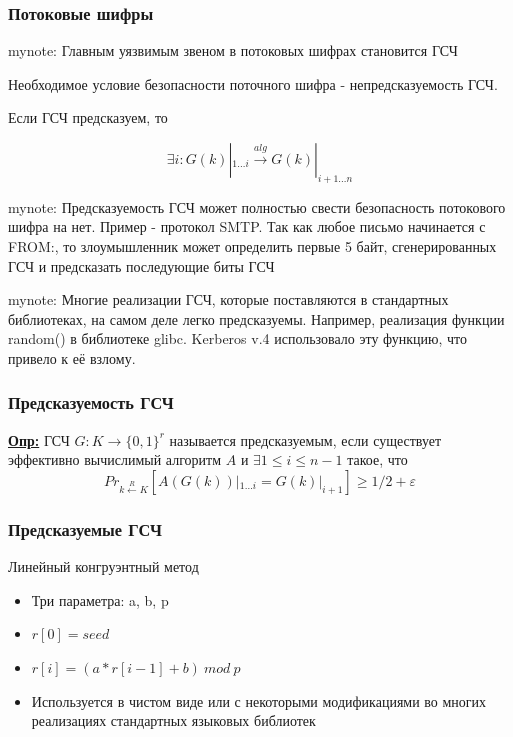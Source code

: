 \documentclass{beamer}
\newcommand{\longdef}[1]{{\textbf{\underline{Опр:}} #1}}
\newcommand{\set}[1]{{\lbrace #1 \rbrace}}
\newcommand{\mynote}[1]{mynote: #1}
\newcommand{\mynote}[1]{}
\begin{document}
\begin{frame}
  \frametitle{Потоковые шифры}

  \mynote{Главным уязвимым звеном в потоковых шифрах становится ГСЧ}

  Необходимое условие безопасности поточного шифра - непредсказуемость ГСЧ.

  \vspace{1em}

  Если ГСЧ предсказуем, то

  \[\exists i: G(k)|_{1 \ldots i} \stackrel{alg}{\longrightarrow} G(k)|_{i+1 \ldots n}\]

  \mynote{Предсказуемость ГСЧ может полностью свести безопасность потокового шифра на нет.
    Пример - протокол SMTP. Так как любое письмо начинается с FROM:, то злоумышленник может определить первые 5
    байт, сгенерированных ГСЧ и предсказать последующие биты ГСЧ}

  \mynote{Многие реализации ГСЧ, которые поставляются в стандартных библиотеках, на самом деле легко предсказуемы.
    Например, реализация функции random() в библиотеке glibc. Kerberos v.4 использовало эту функцию, что привело к её взлому.}

\end{frame}


\begin{frame}
  \frametitle{Предсказуемость ГСЧ}

  \longdef{ГСЧ $G:K \longrightarrow \set{0,1}^{r}$ называется предсказуемым, если существует
   эффективно вычислимый алгоритм $A$ и $\exists 1 \le i \le n-1$ такое, что
    \begin{displaymath}
      {Pr_{k \stackrel{R}{\longleftarrow} K}[A(G(k))|_{1 \ldots i} = G(k)|_{i+1}] \ge 1/2 + \varepsilon}
    \end{displaymath}
  }

\end{frame}


\begin{frame}
  \frametitle{Предсказуемые ГСЧ}

  \begin{block}{Линейный конгруэнтный метод}
    \begin{itemize}
      \item{Три параметра: a, b, p}
      \item{$r[0] = seed$}
      \item{$r[i] = (a*r[i-1]+b)~mod~p$}
      \item{Используется в чистом виде или с некоторыми модификациями во многих реализациях стандартных языковых библиотек}
    \end{itemize}
  \end{block}

\end{frame}
\end{document}
